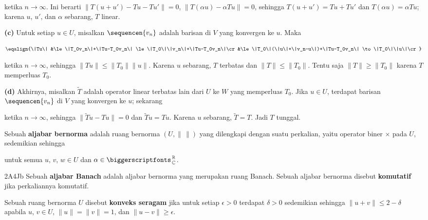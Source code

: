 {

\noindent ketika $n\to\infty$. Ini berarti
$\|T(u+u')-Tu-Tu'\|=0$, $\|T(\alpha u)-\alpha Tu\|=0$, sehingga
$T(u+u')=Tu+Tu'$ dan $T(\alpha u)=\alpha Tu$; karena $u$, $u'$, dan
$\alpha$ sebarang, $T$ linear.

\medskip

{\bf (c)} Untuk setiap $u\in U$, misalkan $\sequencen{v_n}$ adalah
barisan di $V$ yang konvergen ke $u$. Maka

$$\eqalign{\|Tu\|
&\le\|T_0v_n\|+\|Tu-T_0v_n\|
\le\|T_0\|\|v_n\|+\|Tu-T_0v_n\|\cr
&\le\|T_0\|(\|u\|+\|v_n-u\|)+\|Tu-T_0v_n\|
\to\|T_0\|\|u\|\cr}$$

\noindent ketika $n\to\infty$, sehingga
$\|Tu\|\le\|T_0\|\|u\|$. Karena $u$ sebarang, $T$ terbatas dan
$\|T\|\le\|T_0\|$. Tentu saja $\|T\|\ge\|T_0\|$ karena $T$
memperluas $T_0$.

\medskip

{\bf (d)} Akhirnya, misalkan $\tilde T$ adalah operator linear terbatas
lain dari $U$ ke $W$ yang memperluas $T_0$. Jika $u\in U$, terdapat
barisan $\sequencen{v_n}$ di $V$ yang konvergen ke $u$; sekarang


\noindent ketika $n\to\infty$, sehingga $\|\tilde Tu-Tu\|=0$ dan
$\tilde Tu=Tu$. Karena $u$ sebarang, $\tilde T=T$. Jadi $T$ tunggal.
}%

 Sebuah {\bf aljabar bernorma}
adalah ruang bernorma $(U,\|\,\|)$ yang dilengkapi dengan suatu
perkalian, yaitu operator biner $\times$ pada $U$, sedemikian sehingga





\noindent untuk semua $u$, $v$, $w\in U$ dan $\alpha\in\RoverC$.

\spheader 2A4Jb Sebuah {\bf aljabar Banach} adalah aljabar bernorma
yang merupakan ruang Banach. Sebuah aljabar bernorma
disebut {\bf komutatif} jika perkaliannya komutatif.

 Sebuah ruang bernorma $U$ disebut
{\bf konveks seragam} jika untuk setiap $\epsilon>0$ terdapat
$\delta>0$ sedemikian sehingga $\|u+v\|\le 2-\delta$ apabila
$u$, $v\in U$, $\|u\|=\|v\|=1$, dan $\|u-v\|\ge\epsilon$.

\discrpage
